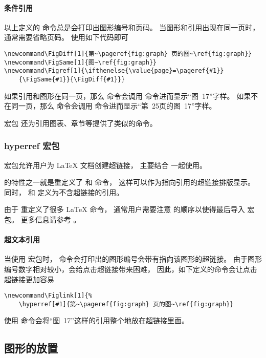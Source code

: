 \paragraph{条件引用}
以上定义的  命令总是会打印出图形编号和页码。
当图形和引用出现在同一页时，通常需要省略页码。
使用如下代码即可
\begin{lstlisting}
\newcommand\FigDiff[1]{第~\pageref{fig:graph} 页的图~\ref{fig:graph}}
\newcommand\FigSame[1]{图~\ref{fig:graph}}
\newcommand\Figref[1]{\ifthenelse{\value{page}=\pageref{#1}}
	{\FigSame{#1}}{\FigDiff{#1}}}
\end{lstlisting}
如果引用和图形在同一页，那么  命令会调用  命令进而显示“图~17”字样。
如果不在同一页，那么  命令会调用  命令进而显示“第~25页的图~17”字样。

宏包  \cite{varioref-doc} 还为引用图表、章节等提供了类似的命令。

\subsubsection{hyperref 宏包}\label{sssec:hyperref}

 宏包允许用户为 \LaTeX{} 文档创建超链接，
主要结合  一起使用。

 的特性之一就是重定义了  和  命令，
这样可以作为指向引用的超链接排版显示。
同时， 和  定义为不含超链接的引用。

由于  重定义了很多 \LaTeX{} 命令，
通常用户需要注意  的顺序以使得最后导入  宏包。
更多信息请参考 \cite{hyperref-doc}。

\paragraph{超文本引用}
当使用  宏包时， 命令会打印出的图形编号会带有指向该图形的超链接。
由于图形编号数字相对较小，会给点击超链接带来困难，
因此，如下定义的命令会让点击超链接更加容易
\begin{lstlisting}
\newcommand\Figlink[1]{%
	\hyperref[#1]{第~\pageref{fig:graph} 页的图~\ref{fig:graph}}
\end{lstlisting}
使用  命令会将“图~17”这样的引用整个地放在超链接里面。


\subsection{图形的放置}\label{ssec:figplacement}


